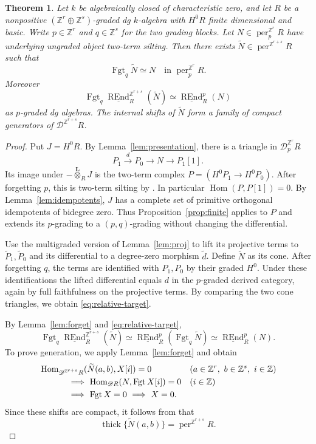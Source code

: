 \documentclass[12pt,a4paper,english,reqno]{amsart}
\theoremstyle{plain}
\newtheorem{thm}{Theorem}[section]
\theoremstyle{definition}
\numberwithin{equation}{section}
\newcommand{\prpref}[1]{Proposition~\ref{#1}}
\newcommand{\lemref}[1]{Lemma~\ref{#1}}
\def\Hom{\operatorname{Hom}}
\def\thick{\operatorname{thick}}
\def\perf{\operatorname{per}}
\def\calD{{\mathcal D}}
\def\bbZ{{\mathbb Z}}
\def\ds{\oplus}
\def\Lox{\overset{\mathbf{L}}{\otimes}}
\def\ya#1{\xrightarrow{#1}}
\newcommand{\Fgt}{\operatorname{Fgt}}
\def\REnd{\operatorname{REnd}}
\newcommand{\uREnd}{\underline{\REnd}}
\begin{document}
\begin{thm}\label{thm:relative}
Let $k$ be algebraically closed of characteristic zero, and let $R$ be a nonpositive $(\bbZ^r\ds\bbZ^s)$-graded dg $k$-algebra with $H^0R$ finite dimensional and basic. Write $p\in\bbZ^r$ and $q\in\bbZ^s$ for the two grading blocks. Let $N\in\perf^{\bbZ^r}_pR$ have underlying ungraded object two-term silting. Then there exists $\widetilde N\in\perf^{\bbZ^{r+s}}R$ such that
\begin{equation}\label{eq:relative-target}
 \Fgt_q\widetilde N\simeq N\quad\text{in }\perf^{\bbZ^r}_pR.
\end{equation}
Moreover
\[
 \Fgt_q\uREnd^{\bbZ^{r+s}}_R(\widetilde N)\simeq\uREnd^p_R(N)
\]
as $p$-graded dg algebras. The internal shifts of $\widetilde N$ form a family of compact generators of $\calD^{\bbZ^{r+s}}R$.
\end{thm}
\begin{proof}
Put $J=H^0R$. By \lemref{lem:presentation}, there is a triangle in $\calD^{\bbZ^r}_pR$
\[
 P_1\ya{d}P_0\longrightarrow N\longrightarrow P_1[1].
\]
Its image under $-\Lox_RJ$ is the two-term complex
$P=(H^0P_1\to H^0P_0)$. After forgetting $p$, this is two-term silting by \cite[Proposition 3.2(a)]{XYZ}. In particular $\Hom(P,P[1])=0$. By \lemref{lem:idempotents}, $J$ has a complete set of primitive orthogonal idempotents of bidegree zero. Thus \prpref{prop:finite} applies to $P$ and extends its $p$-grading to a $(p,q)$-grading without changing the differential.

Use the multigraded version of \lemref{lem:proj} to lift its projective terms to $\widetilde P_1,\widetilde P_0$ and its differential to a degree-zero morphism $\widetilde d$. Define $\widetilde N$ as its cone. After forgetting $q$, the terms are identified with $P_1,P_0$ by their graded $H^0$. Under these identifications the lifted differential equals $d$ in the $p$-graded derived category, again by full faithfulness on the projective terms. By comparing the two cone triangles, we obtain \eqref{eq:relative-target}.

By \lemref{lem:forget} and \eqref{eq:relative-target},
\[
 \Fgt_q\uREnd_R^{\bbZ^{r+s}}(\widetilde N)
 \simeq\uREnd_R^p(\Fgt_q\widetilde N)
 \simeq\uREnd_R^p(N).
\]
To prove generation, we apply \lemref{lem:forget} and obtain
\[
 \begin{aligned}
 &\Hom_{\calD^{\bbZ^{r+s}}R}(\widetilde N(a,b),X[i])=0
       &&(a\in\bbZ^r,\ b\in\bbZ^s,\ i\in\bbZ)\\
 &\hspace{12mm}\Longrightarrow\ \Hom_{\calD R}(N,\Fgt X[i])=0
       &&(i\in\bbZ)\\
 &\hspace{12mm}\Longrightarrow\ \Fgt X=0\ \Longrightarrow\ X=0.
 \end{aligned}
\]
Since these shifts are compact, it follows from \cite[Theorem 3.4]{KellerDG} that
\[
 \thick\{\widetilde N(a,b)\}=\perf^{\bbZ^{r+s}}R.
\]
\end{proof}
\end{document}
